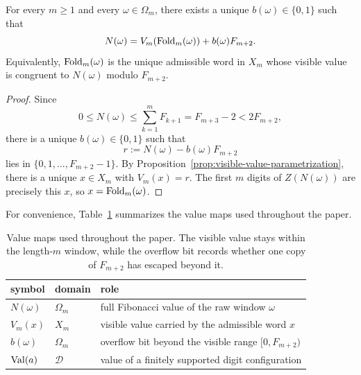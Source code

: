 \begin{corollary}
\label{cor:visible-value-overflow}
For every $m\ge 1$ and every $\omega\in\Omega_m$, there exists a unique
$b(\omega)\in\{0,1\}$ such that
\[
N(\omega)=V_m(\operatorname{Fold}_m(\omega))+b(\omega)F_{m+2}.
\]
Equivalently, $\operatorname{Fold}_m(\omega)$ is the unique admissible word in $X_m$ whose
visible value is congruent to $N(\omega)$ modulo $F_{m+2}$.
\end{corollary}

\begin{proof}
Since
\[
0\le N(\omega)\le \sum_{k=1}^m F_{k+1}=F_{m+3}-2<2F_{m+2},
\]
there is a unique $b(\omega)\in\{0,1\}$ such that
\[
r:=N(\omega)-b(\omega)F_{m+2}
\]
lies in $\{0,1,\ldots,F_{m+2}-1\}$.  By
Proposition~\ref{prop:visible-value-parametrization}, there is a unique
$x\in X_m$ with $V_m(x)=r$.  The first $m$ digits of $Z(N(\omega))$ are
precisely this $x$, so $x=\operatorname{Fold}_m(\omega)$.
\end{proof}

For convenience, Table~\ref{tab:value-maps} summarizes the value maps used
throughout the paper.

\begin{table}[t]
\centering
\small
\begin{tabular}{lll}
\toprule
symbol & domain & role \\
\midrule
$N(\omega)$ & $\Omega_m$ & full Fibonacci value of the raw window $\omega$ \\
$V_m(x)$ & $X_m$ & visible value carried by the admissible word $x$ \\
$b(\omega)$ & $\Omega_m$ & overflow bit beyond the visible range $[0,F_{m+2})$ \\
$\operatorname{Val}(a)$ & $\mathcal D$ & value of a finitely supported digit configuration \\
\bottomrule
\end{tabular}
\caption{Value maps used throughout the paper.  The visible value stays within
the length-$m$ window, while the overflow bit records whether one copy of
$F_{m+2}$ has escaped beyond it.}
\label{tab:value-maps}
\end{table}
